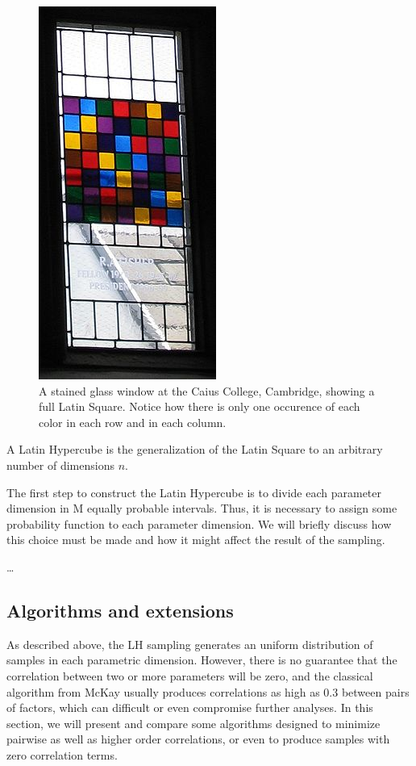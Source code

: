 \documentclass[12pt,a4paper]{article}
\begin{document}
\begin{figure}[htpb]
	\begin{center}
		\includegraphics{glassLS.png}
	\end{center}
	\caption{A stained glass window at the Caius College, Cambridge, showing a full Latin Square. Notice how there is only one occurence of each color in each row and in each column.}
	\label{fig:glassLS}
\end{figure}

A Latin Hypercube is the generalization of the Latin Square to an arbitrary number of dimensions $n$. 

The first step to construct the Latin Hypercube is to divide each parameter dimension in M equally probable intervals. Thus, it
is necessary to assign some probability function to each parameter dimension. We will briefly discuss how this choice must
be made and how it might affect the result of the sampling.

\dots

\subsection{Algorithms and extensions}
As described above, the LH sampling generates an uniform distribution of samples in each parametric dimension. However, 
there is no guarantee that the correlation between two or more parameters will be zero, and the classical algorithm
from McKay \cite{McKay} usually produces correlations as high as 0.3 between pairs of factors, which can difficult or even
compromise further analyses. In this section, we will present and compare some algorithms designed to minimize pairwise 
as well as higher order correlations, or even to produce samples with zero correlation terms.
\end{document}
